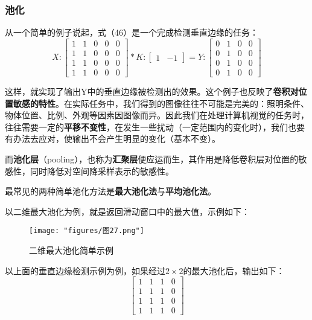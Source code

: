 \subsubsection{池化}
从一个简单的例子说起，式（46）是一个完成检测垂直边缘的任务：
\begin{equation}X{:}\begin{bmatrix}1&1&0&0&0\\1&1&0&0&0\\1&1&0&0&0\\1&1&0&0&0\end{bmatrix}*K{:}\begin{bmatrix}1&-1\end{bmatrix}=Y{:}\begin{bmatrix}0&1&0&0\\0&1&0&0\\0&1&0&0\\0&1&0&0\end{bmatrix}\end{equation}

这样，就实现了输出Y中的垂直边缘被检测出的效果。这个例子也反映了\textbf{卷积对位置敏感的特性}。在实际任务中，我们得到的图像往往不可能是完美的：照明条件、物体位置、比例、外观等因素因图像而异。因此我们在处理计算机视觉的任务时，往往需要一定的\textbf{平移不变性}，在发生一些扰动（一定范围内的变化时），我们也要有办法去应对，使输出不会产生明显的变化（基本不变）。

而\textbf{池化层}（pooling），也称为\textbf{汇聚层}便应运而生，其作用是降低卷积层对位置的敏感性，同时降低对空间降采样表示的敏感性。

最常见的两种简单池化方法是\textbf{最大池化法}与\textbf{平均池化法}。

以二维最大池化为例，就是返回滑动窗口中的最大值，示例如下：
\begin{figure}[ht] %
	\centering
	\texttt{[image: "figures/图27.png"]} %
	\caption{二维最大池化简单示例} %
	\label{fig:example} %
\end{figure}

以上面的垂直边缘检测示例为例，如果经过$2\times2$的最大池化后，输出如下：
\begin{equation}\begin{bmatrix}1&1&1&0\\1&1&1&0\\1&1&1&0\\1&1&1&0\end{bmatrix}\end{equation}

